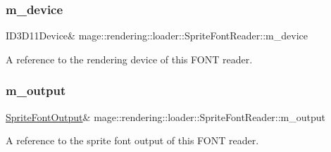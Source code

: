 \subsubsection{\texorpdfstring{m\+\_\+device}{m\_device}}
{\footnotesize\ttfamily I\+D3\+D11\+Device\& mage\+::rendering\+::loader\+::\+Sprite\+Font\+Reader\+::m\+\_\+device\hspace{0.3cm}{\ttfamily [private]}}

A reference to the rendering device of this F\+O\+NT reader. \mbox{\label{classmage_1_1rendering_1_1loader_1_1_sprite_font_reader_ab14aaeb914ddc7f448ae8fe5ce021d3a}} 
\subsubsection{\texorpdfstring{m\+\_\+output}{m\_output}}
{\footnotesize\ttfamily \mbox{\hyperlink{structmage_1_1rendering_1_1_sprite_font_output}{Sprite\+Font\+Output}}\& mage\+::rendering\+::loader\+::\+Sprite\+Font\+Reader\+::m\+\_\+output\hspace{0.3cm}{\ttfamily [private]}}

A reference to the sprite font output of this F\+O\+NT reader. 